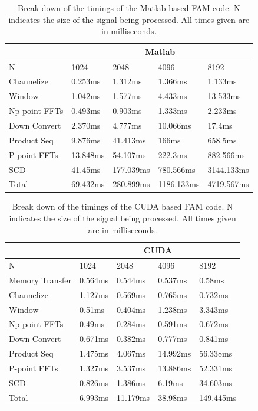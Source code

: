 \begin{table}
\begin{center}
\begin{tabular}{|l|l|l|l|l|}
\hline
 & \multicolumn{4}{|c|}{Matlab} \\
\hline
N & 1024 & 2048 & 4096 & 8192 \\
\hline
Channelize & 0.253ms & 1.312ms & 1.366ms & 1.133ms \\
Window & 1.042ms & 1.577ms & 4.433ms & 13.533ms \\
Np-point FFTs & 0.493ms & 0.903ms & 1.333ms & 2.233ms \\
Down Convert & 2.370ms & 4.777ms & 10.066ms & 17.4ms \\
Product Seq & 9.876ms & 41.413ms & 166ms & 658.5ms \\
P-point FFTs & 13.848ms & 54.107ms & 222.3ms & 882.566ms \\
SCD & 41.45ms & 177.039ms & 780.566ms & 3144.133ms \\
\hline
Total & 69.432ms & 280.899ms & 1186.133ms & 4719.567ms \\
\hline
\end{tabular}
\vspace{0.5cm}
\caption{Break down of the timings of the Matlab based FAM code.  N indicates the size of the signal being processed.  All times given are in milliseconds.}
\label{tbl:fam_matlab_timings}
\end{center}
\end{table}


\begin{table}
\begin{center}
\begin{tabular}{|l|l|l|l|l|}
\hline
 & \multicolumn{4}{|c|}{CUDA} \\
\hline
N & 1024 & 2048 & 4096 & 8192 \\
\hline
Memory Transfer & 0.564ms & 0.544ms & 0.537ms & 0.58ms \\
Channelize & 1.127ms & 0.569ms & 0.765ms & 0.732ms \\
Window & 0.51ms & 0.404ms & 1.238ms & 3.343ms \\
Np-point FFTs & 0.49ms & 0.284ms & 0.591ms & 0.672ms \\
Down Convert & 0.671ms & 0.382ms & 0.777ms & 0.841ms \\
Product Seq & 1.475ms & 4.067ms & 14.992ms & 56.338ms \\
P-point FFTs & 1.327ms & 3.537ms & 13.886ms & 52.331ms \\
SCD & 0.826ms & 1.386ms & 6.19ms & 34.603ms \\
\hline
Total & 6.993ms & 11.179ms & 38.98ms & 149.445ms \\
\hline
\end{tabular}
\vspace{0.5cm}
\caption{Break down of the timings of the CUDA based FAM code.  N indicates the size of the signal being processed.  All times given are in milliseconds.}
\label{tbl:fam_cuda_timings}
\end{center}
\end{table}

